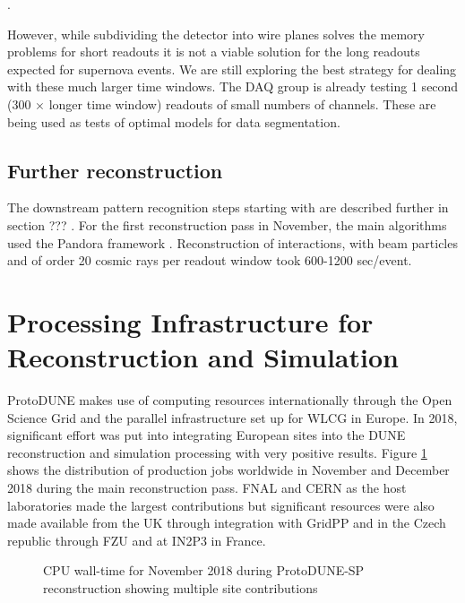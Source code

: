 . 

However,  while subdividing the detector into wire planes solves the memory problems for short readouts it is  not a viable solution for the long readouts expected for supernova events. We are still exploring the best strategy for dealing with these much larger time windows. The DAQ group is already testing 1 second (300 $\times$ longer time window) readouts of small numbers of channels.  These are being used as tests of optimal models for data segmentation. 

\subsection{Further reconstruction}
The downstream pattern recognition steps starting with  are described further in section ??? .  For the first reconstruction pass in November, the main algorithms used the Pandora framework \cite{Acciarri:2017hat}.
Reconstruction of  interactions, with beam particles and of order 20 cosmic rays per readout window took 600-1200 sec/event.



 



\section{Processing Infrastructure for Reconstruction and Simulation}
\label{ch-comp-processing}
ProtoDUNE makes use of computing resources internationally through the Open Science Grid and the parallel infrastructure set up for WLCG in Europe.  In 2018, significant effort was put into integrating European sites into the DUNE reconstruction and simulation processing with very positive results.  
Figure \ref{fig:ch-exec-comp-cpupie} shows the distribution of production jobs worldwide in November and December 2018 during the main reconstruction pass.  FNAL and CERN as the host laboratories made the largest contributions but significant resources were also made available from the UK through integration with GridPP and in the Czech republic through FZU and at IN2P3 in France. 

\begin{figure}[htp]
\centering
\caption{CPU wall-time for November 2018 during ProtoDUNE-SP reconstruction showing multiple site contributions}
\label{fig:ch-exec-comp-cpupie}
\end{figure}


